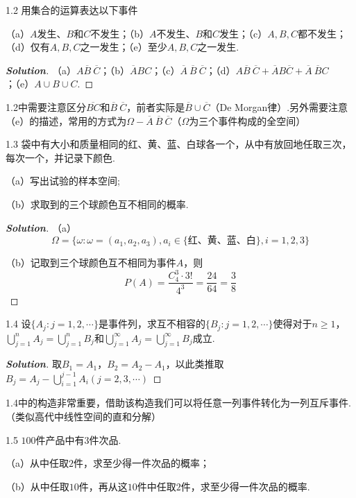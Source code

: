 \documentclass[10pt, a4paper, oneside]{ctexart}
\newenvironment{solution}{\begin{proof}[\bf Solution]}{\end{proof}}
\begin{document}
1.2 用集合的运算表达以下事件

（a）$A$发生、$B$和$C$不发生；（b）$A$不发生、$B$和$C$发生；（c）$A,B,C$都不发生；（d）仅有$A,B,C$之一发生；（e）至少$A,B,C$之一发生.
\begin{solution}
（a）$A\overline{B}\:{\overline{C}}$；（b）$\overline{A}BC$；（c）$\overline{A}\:\overline{B}\:\overline{C}$；（d）$A\overline{B}\:\overline{C}+\overline{A}B\overline{C}+\overline{A}\:\overline{B}C$；（e）$A\cup B\cup C$.
\end{solution}
\begin{remark}
1.2中需要注意区分$\overline{BC}$和$\overline{B}\:\overline{C}$，前者实际是$\overline{B}\cup \overline{C}$（De Morgan律）.另外需要注意（e）的描述，常用的方式为$\Omega-\overline{A}\:\overline{B}\:\overline{C}$（$\Omega$为三个事件构成的全空间）
\end{remark}

1.3 袋中有大小和质量相同的红、黄、蓝、白球各一个，从中有放回地任取三次，每次一个，并记录下颜色.

（a）写出试验的样本空间;

（b）求取到的三个球颜色互不相同的概率.
\begin{solution}
（a）
\[\Omega  = \{ \omega :\omega  = ({a_1},{a_2},{a_3}),{a_i} \in \{\text{红、黄、蓝、白} \} ,i = 1,2,3\} \]

（b）记取到三个球颜色互不相同为事件$A$，则
\[P(A) = \frac{{C_4^3}\cdot 3!}{{{4^3}}} = \frac{{24}}{{64}} = \frac{3}{8}\]
\end{solution}

1.4 设$\{A_j:j=1,2,\cdots\}$是事件列，求互不相容的$\{B_j:j=1,2,\cdots\}$使得对于$n\geqslant 1$，$\bigcup\limits_{j = 1}^n {{A_j}}  = \bigcup\limits_{j = 1}^n {{B_j}} $和$\bigcup\limits_{j = 1}^\infty  {{A_j}}  = \bigcup\limits_{j = 1}^\infty  {{B_j}} $成立.
\begin{solution}
取$B_1=A_1$，$B_2=A_2-A_1$，以此类推取$B_j=A_j-\bigcup\limits_{i = 1}^{j-1} {{A_i}}(j=2,3,\cdots)$
\end{solution}
\begin{remark}
1.4中的构造非常重要，借助该构造我们可以将任意一列事件转化为一列互斥事件.（类似高代中线性空间的直和分解）
\end{remark}


1.5 $100$件产品中有$3$件次品.

（a）从中任取$2$件，求至少得一件次品的概率；

（b）从中任取$10$件，再从这$10$件中任取$2$件，求至少得一件次品的概率.
\end{document}
